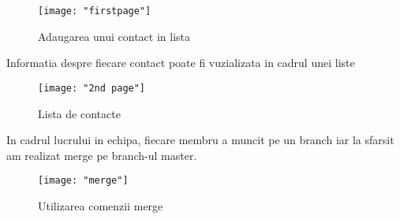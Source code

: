 \begin{figure}[h!]
			\centering
 			 \texttt{[image: "firstpage"]}
 			 \caption{Adaugarea unui contact in lista}
 			 \label{fig:Pagina principala}
		\end{figure}	
Informatia despre fiecare contact poate fi vuzializata in cadrul unei liste
	
	\begin{figure}[h!]
			\centering
 			 \texttt{[image: "2nd page"]}
 			 \caption{Lista de contacte}
 			 \label{fig:AnimePage}
		\end{figure}



In cadrul lucrului in echipa, fiecare membru a muncit pe un branch iar la sfarsit am realizat merge pe branch-ul master.

	\begin{figure}[h!]
			\centering
 			 \texttt{[image: "merge"]}
 			 \caption{Utilizarea comenzii merge}
 			 \label{fig:Calcui}
		\end{figure}











